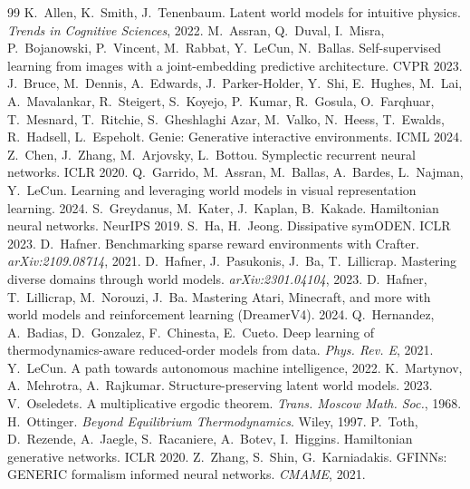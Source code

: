 \documentclass[preprint,12pt]{article}
\begin{document}

\begin{thebibliography}{99}
 K.~Allen, K.~Smith, J.~Tenenbaum.
Latent world models for intuitive physics. \emph{Trends in Cognitive
Sciences}, 2022.
 M.~Assran, Q.~Duval, I.~Misra,
P.~Bojanowski, P.~Vincent, M.~Rabbat, Y.~LeCun, N.~Ballas. Self-supervised
learning from images with a joint-embedding predictive architecture. CVPR
2023.
 J.~Bruce, M.~Dennis,
A.~Edwards, J.~Parker-Holder, Y.~Shi, E.~Hughes, M.~Lai, A.~Mavalankar,
R.~Steigert, S.~Koyejo, P.~Kumar, R.~Gosula, O.~Farqhuar, T.~Mesnard,
T.~Ritchie, S.~Gheshlaghi Azar, M.~Valko, N.~Heess, T.~Ewalds, R.~Hadsell,
L.~Espeholt. Genie: Generative interactive environments. ICML 2024.
 Z.~Chen, J.~Zhang, M.~Arjovsky,
L.~Bottou. Symplectic recurrent neural networks. ICLR 2020.
 Q.~Garrido, M.~Assran,
M.~Ballas, A.~Bardes, L.~Najman, Y.~LeCun. Learning and leveraging
world models in visual representation learning. 2024.
 S.~Greydanus, M.~Kater,
J.~Kaplan, B.~Kakade. Hamiltonian neural networks. NeurIPS 2019.
 S.~Ha, H.~Jeong. Dissipative
symODEN. ICLR 2023.
 D.~Hafner. Benchmarking
sparse reward environments with Crafter. \emph{arXiv:2109.08714}, 2021.
 D.~Hafner, J.~Pasukonis,
J.~Ba, T.~Lillicrap. Mastering diverse domains through world models.
\emph{arXiv:2301.04104}, 2023.
 D.~Hafner, T.~Lillicrap,
M.~Norouzi, J.~Ba. Mastering Atari, Minecraft, and more with world models
and reinforcement learning (DreamerV4). 2024.
 Q.~Hernandez, A.~Badias,
D.~Gonzalez, F.~Chinesta, E.~Cueto. Deep learning of thermodynamics-aware
reduced-order models from data. \emph{Phys. Rev. E}, 2021.
 Y.~LeCun. A path towards autonomous
machine intelligence, 2022.
 K.~Martynov, A.~Mehrotra,
A.~Rajkumar. Structure-preserving latent world models. 2023.
 V.~Oseledets. A multiplicative
ergodic theorem. \emph{Trans. Moscow Math. Soc.}, 1968.
 H.~Ottinger. \emph{Beyond
Equilibrium Thermodynamics}. Wiley, 1997.
 P.~Toth, D.~Rezende, A.~Jaegle,
S.~Racaniere, A.~Botev, I.~Higgins. Hamiltonian generative networks. ICLR
2020.
 Z.~Zhang, S.~Shin, G.~Karniadakis.
GFINNs: GENERIC formalism informed neural networks. \emph{CMAME}, 2021.
\end{thebibliography}
\end{document}
